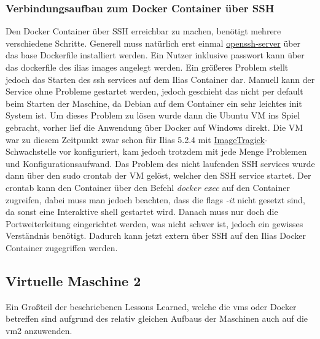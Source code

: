 \documentclass[10pt, a4paper,onecolumn ,titlepage]{article}
\begin{document}
    \subsubsection{Verbindungsaufbau zum Docker Container über SSH}
    \label{subsubsec:lessonslearnedDockerSSH}
    Den Docker Container über SSH erreichbar zu machen, benötigt mehrere verschiedene Schritte. Generell muss natürlich erst einmal \href{https://github.com/openssh}{openssh-server} über das base Dockerfile
    installiert werden. Ein Nutzer inklusive passwort kann über das dockerfile des ilias images angelegt werden. Ein größeres Problem stellt jedoch das Starten des ssh services auf dem Ilias Container dar.
    Manuell kann der Service ohne Probleme gestartet werden, jedoch geschieht das nicht per default beim Starten der Maschine, da Debian auf dem Container ein sehr leichtes init System ist. Um dieses Problem
    zu lösen wurde dann die Ubuntu VM ins Spiel gebracht, vorher lief die Anwendung über Docker auf Windows direkt. Die VM war zu diesem Zeitpunkt zwar schon für Ilias 5.2.4 mit \hyperref[subsubsec:CVE-2016-3714]{ImageTragick}-Schwachstelle
    vor konfiguriert, kam jedoch trotzdem mit jede Menge Problemen und Konfigurationsaufwand. Das Problem des nicht laufenden SSH services wurde dann über den sudo crontab der VM gelöst, welcher den SSH service startet.
    Der crontab kann den Container über den Befehl \textit{docker exec} auf den Container zugreifen, dabei muss man jedoch beachten, dass die flags \textit{-it} nicht gesetzt sind, da sonst eine Interaktive shell gestartet wird.
    Danach muss nur doch die Portweiterleitung eingerichtet werden, was nicht schwer ist, jedoch ein gewisses Verständnis benötigt. Dadurch kann jetzt extern über SSH auf den Ilias Docker Container zugegriffen werden.

    \subsection{Virtuelle Maschine 2}
    \label{subsec:vm2LessonsLearned}
    Ein Großteil der beschriebenen Lessons Learned, welche die \ac{vm}s oder Docker betreffen sind aufgrund des relativ gleichen Aufbaus der Maschinen auch auf die \ac{vm}2 anzuwenden.
\end{document}
